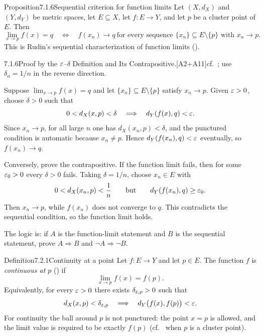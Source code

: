\documentclass[main.tex]{subfiles}
\begin{document}
\begin{Obj}{Proposition}{7.1.6}{Sequential criterion for function limits}
Let $(X,d_X)$ and $(Y,d_Y)$ be metric spaces, let $E\subseteq X$, let $f:E\to Y$, and let $p$ be a
cluster point of $E$. Then
\[
  \lim_{x\to p}f(x)=q
  \quad\Longleftrightarrow\quad
  f(x_n)\to q
  \ \text{for every sequence } \{x_n\}\subseteq E\setminus\{p\} \text{ with } x_n\to p .
\]
This is Rudin's sequential characterization of function limits ().
\end{Obj}
\begin{Prf}{7.1.6}{Proof by the $\varepsilon$--$\delta$ Definition and Its Contrapositive.}{[A2$+$A11]\quad cf.\ ; use $\delta_n=1/n$ in the reverse direction.}
\item Suppose $\lim_{x\to p}f(x)=q$ and let $\{x_n\}\subseteq E\setminus\{p\}$ satisfy $x_n\to p$.
  Given $\varepsilon>0$, choose $\delta>0$ such that
  \[
    0<d_X(x,p)<\delta\quad\Longrightarrow\quad d_Y(f(x),q)<\varepsilon .
  \]
  Since $x_n\to p$, for all large $n$ one has $d_X(x_n,p)<\delta$, and the punctured condition is
  automatic because $x_n\ne p$. Hence $d_Y(f(x_n),q)<\varepsilon$ eventually, so $f(x_n)\to q$.
\item Conversely, prove the contrapositive. If the function limit fails, then for some
  $\varepsilon_0>0$ every $\delta>0$ fails. Taking $\delta=1/n$, choose $x_n\in E$ with
  \[
    0<d_X(x_n,p)<\frac1n
    \qquad\text{but}\qquad
    d_Y(f(x_n),q)\ge\varepsilon_0 .
  \]
  Then $x_n\to p$, while $f(x_n)$ does not converge to $q$. This contradicts the sequential
  condition, so the function limit holds.
\end{Prf}

\noindent The logic is: if $A$ is the function-limit statement and $B$ is the sequential
statement, prove $A\Rightarrow B$ and $\neg A\Rightarrow\neg B$.


\begin{Obj}{Definition}{7.2.1}{Continuity at a point}
Let $f:E\to Y$ and let $p\in E$. The function $f$ is \emph{continuous at $p$} () if
\[
  \lim_{x\to p}f(x)=f(p).
\]
Equivalently, for every $\varepsilon>0$ there exists $\delta_{\varepsilon,p}>0$ such that
\[
  d_X(x,p)<\delta_{\varepsilon,p}
  \quad\Longrightarrow\quad
  d_Y\bigl(f(x),f(p)\bigr)<\varepsilon .
\]
For continuity the ball around $p$ is not punctured: the point $x=p$ is allowed, and the limit
value is required to be exactly $f(p)$ (cf.\  when $p$ is a cluster point).
\end{Obj}
\end{document}
